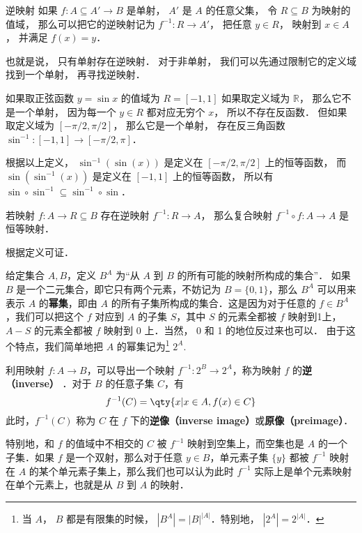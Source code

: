 \begin{definition}{逆映射}
如果 $f: A\subseteq A' \to B$ 是单射， $A'$ 是 $A$ 的任意父集， 令 $R \subseteq B$ 为映射的值域， 那么可以把它的逆映射记为 $f^{-1}: R \to A'$， 把任意 $y \in R$， 映射到 $x \in A$， 并满足 $f(x) = y$．
\end{definition}
也就是说， 只有单射存在逆映射． 对于非单射， 我们可以先通过限制它的定义域找到一个单射， 再寻找逆映射．

\begin{example}{}
如果取正弦函数 $y = \sin x$ 的值域为 $R = [-1, 1]$ 如果取定义域为 $\mathbb R$，  那么它不是一个单射， 因为每一个 $y \in R$ 都对应无穷个 $x$， 所以不存在反函数． 但如果取定义域为 $[-\pi/2, \pi/2]$， 那么它是一个单射， 存在反三角函数 $\sin^{-1}: [-1, 1] \to [-\pi/2, \pi]$．

根据以上定义， $\sin^{-1} (\sin(x))$ 是定义在 $[-\pi/2, \pi/2]$ 上的恒等函数， 而 $\sin (\sin^{-1}(x))$ 是定义在 $[-1, 1]$ 上的恒等函数， 所以有 $\sin \circ \sin^{-1} \subseteq \sin^{-1} \circ \sin$．
\end{example}

\begin{corollary}{}
若映射 $f:A \to R \subseteq B$ 存在逆映射 $f^{-1}: R \to A$， 那么复合映射 $f^{-1} \circ f: A \to A$ 是恒等映射．
\end{corollary}
根据定义可证．


给定集合 $A, B$，定义 $B^A$ 为“从 $A$ 到 $B$ 的所有可能的映射所构成的集合”． 如果 $B$ 是一个二元集合，即它只有两个元素，不妨记为 $B=\{0,1\}$，那么 $B^A$ 可以用来表示 $A$ 的\textbf{幂集}，即由 $A$ 的所有子集所构成的集合．这是因为对于任意的 $f\in B^A$，我们可以把这个 $f$ 对应到 $A$ 的子集 $S$，其中 $S$ 的元素全都被 $f$ 映射到1上， $A-S$ 的元素全都被 $f$ 映射到 0 上．当然， 0 和 1 的地位反过来也可以． 由于这个特点，我们简单地把 $A$ 的幂集记为\footnote{当 $A$， $B$ 都是有限集的时候， $|B^A|=|B|^{|A|}$．特别地， $|2^A|=2^{|A|}$．}  $2^A$. 

利用映射 $f:A\to B$，可以导出一个映射 $f^{-1}:2^B \to 2^A$，称为映射 $f$ 的\textbf{逆（inverse）} ．对于 $B$ 的任意子集 $C$，有
\begin{equation}
f^{-1}(C) = \qty{x | x \in A, f(x) \in C}
\end{equation}
此时，$f^{-1}(C)$ 称为 $C$ 在 $f$ 下的\textbf{逆像（inverse image）}或\textbf{原像（preimage）}．

特别地，和 $f$ 的值域中不相交的 $C$ 被 $f^{-1}$ 映射到空集上，而空集也是 $A$ 的一个子集．如果 $f$ 是一个双射，那么对于任意 $y\in B$，单元素子集 $\{y\}$ 都被 $f^{-1}$ 映射在 $A$ 的某个单元素子集上，那么我们也可以认为此时 $f^{-1}$ 实际上是单个元素映射在单个元素上，也就是从 $B$ 到 $A$ 的映射．

